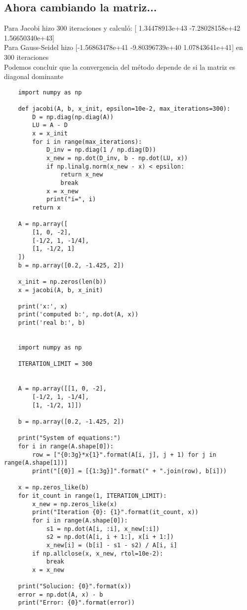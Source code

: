 \documentclass{article}
\begin{document}
\subsection{Ahora cambiando la matriz...}
Para Jacobi hizo 300 iteraciones y calculó: [ 1.34478913e+43 -7.28028158e+42  1.56650340e+43]\\
Para Gauss-Seidel hizo [-1.56863478e+41 -9.80396739e+40  1.07843641e+41] en 300 iteraciones\\

Podemos concluir que la convergencia del método depende de si la matriz es diagonal dominante

\begin{lstlisting}
    import numpy as np 

    def jacobi(A, b, x_init, epsilon=10e-2, max_iterations=300):
        D = np.diag(np.diag(A))
        LU = A - D
        x = x_init
        for i in range(max_iterations):
            D_inv = np.diag(1 / np.diag(D))
            x_new = np.dot(D_inv, b - np.dot(LU, x))
            if np.linalg.norm(x_new - x) < epsilon:
                return x_new
                break
            x = x_new
            print("i=", i)
        return x
    
    A = np.array([
        [1, 0, -2],
        [-1/2, 1, -1/4],
        [1, -1/2, 1]
    ])
    b = np.array([0.2, -1.425, 2])
    
    x_init = np.zeros(len(b))
    x = jacobi(A, b, x_init)
    
    print('x:', x)
    print('computed b:', np.dot(A, x))
    print('real b:', b)


    import numpy as np

    ITERATION_LIMIT = 300
    
    
    A = np.array([[1, 0, -2],
        [-1/2, 1, -1/4],
        [1, -1/2, 1]])
    
    b = np.array([0.2, -1.425, 2])
    
    print("System of equations:")
    for i in range(A.shape[0]):
        row = ["{0:3g}*x{1}".format(A[i, j], j + 1) for j in range(A.shape[1])]
        print("[{0}] = [{1:3g}]".format(" + ".join(row), b[i]))
    
    x = np.zeros_like(b)
    for it_count in range(1, ITERATION_LIMIT):
        x_new = np.zeros_like(x)
        print("Iteration {0}: {1}".format(it_count, x))
        for i in range(A.shape[0]):
            s1 = np.dot(A[i, :i], x_new[:i])
            s2 = np.dot(A[i, i + 1:], x[i + 1:])
            x_new[i] = (b[i] - s1 - s2) / A[i, i]
        if np.allclose(x, x_new, rtol=10e-2):
            break
        x = x_new
    
    print("Solucion: {0}".format(x))
    error = np.dot(A, x) - b
    print("Error: {0}".format(error))
\end{lstlisting}
\end{document}
